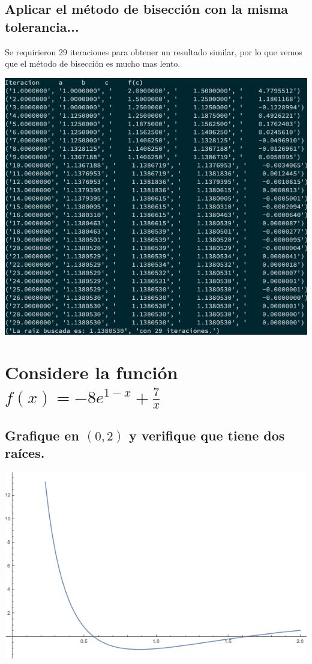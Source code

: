 \documentclass{article}
\begin{document}
\subsection{Aplicar el método de bisección con la misma tolerancia...}
Se requirieron 29 iteraciones para obtener un resultado similar, por lo que vemos que el método de bisección es mucho mas lento.
\begin{center}
\includegraphics[scale=0.5]{salidaBiseccion.png}    
\end{center}
\section{Considere la función $f(x) = -8e^{1-x} + \frac{7}x{}$}
\subsection{Grafique en $(0,2)$ y verifique que tiene dos raíces.}
\includegraphics[scale=0.5]{grafica2.png}   
\end{document}
